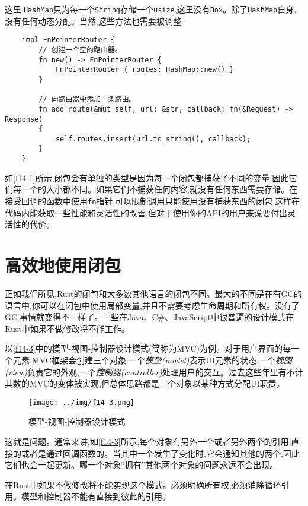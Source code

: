 这里,\texttt{HashMap}只为每一个\texttt{String}存储一个\texttt{usize},这里没有\texttt{Box}。除了\texttt{HashMap}自身,没有任何动态分配。当然,这些方法也需要被调整:
\begin{verbatim}
    impl FnPointerRouter {
        // 创建一个空的路由器。
        fn new() -> FnPointerRouter {
            FnPointerRouter { routes: HashMap::new() }
        }

        // 向路由器中添加一条路由。
        fn add_route(&mut self, url: &str, callback: fn(&Request) -> Response)
        {
            self.routes.insert(url.to_string(), callback);
        }
    }
\end{verbatim}

如\autoref{f14-1}所示,闭包会有单独的类型是因为每一个闭包都捕获了不同的变量,因此它们每一个的大小都不同。如果它们不捕获任何内容,就没有任何东西需要存储。在接受回调的函数中使用\texttt{fn}指针,可以限制调用只能使用没有捕获东西的闭包,这样在代码内能获取一些性能和灵活性的改善,但对于使用你的API的用户来说要付出灵活性的代价。

\section{高效地使用闭包}

正如我们所见,Rust的闭包和大多数其他语言的闭包不同。最大的不同是在有GC的语言中,你可以在闭包中使用局部变量,并且不需要考虑生命周期和所有权。没有了GC,事情就变得不一样了。一些在Java、C\#、JavaScript中很普遍的设计模式在Rust中如果不做修改将不能工作。

以\autoref{f14-3}中的模型-视图-控制器设计模式(简称为MVC)为例。对于用户界面的每一个元素,MVC框架会创建三个对象:一个\emph{模型(model)}表示UI元素的状态,一个\emph{视图(view)}负责它的外观,一个\emph{控制器(controller)}处理用户的交互。过去这些年里有不计其数的MVC的变体被实现,但总体思路都是三个对象以某种方式分配UI职责。

\begin{figure}[htbp]
    \centering
    \texttt{[image: ../img/f14-3.png]}
    \caption{模型-视图-控制器设计模式}
    \label{f14-3}
\end{figure}

这就是问题。通常来讲,如\autoref{f14-3}所示,每个对象有另外一个或者另外两个的引用,直接的或者是通过回调函数的。当其中一个发生了变化时,它会通知其他的两个,因此它们也会一起更新。哪一个对象“拥有”其他两个对象的问题永远不会出现。

在Rust中如果不做修改将不能实现这个模式。必须明确所有权,必须消除循环引用。模型和控制器不能有直接到彼此的引用。


